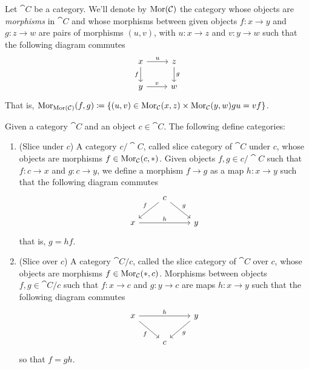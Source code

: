 \begin{definition}
\label{def:morphism-category}
Let \(\cat C\) be a category. We'll denote by \(\operatorname{Mor}(\mathcal C)\) the category
whose objects are \emph{morphisms} in \(\cat C\) and whose morphisms between
given objects \(f: x \to y\) and \(g: z \to w\) are pairs of morphisms \((u,
v)\), with \(u: x \to z\) and \(v: y \to w\) such that the following diagram
commutes
\[
  \begin{tikzcd}
    x \ar[d, swap, "f"] \ar[r, "u"] &z \ar[d, "g"] \\
    y \ar[r, "v"] &w
  \end{tikzcd}
\]
That is, \(\operatorname{Mor}_{\operatorname{Mor}(\mathcal C)}(f, g) \coloneq \{(u, v) \in \operatorname{Mor}_{\mathcal C}(x, z)
\times \operatorname{Mor}_{\mathcal C}(y, w) \relax g u = v f\}\).
\end{definition}

\begin{proposition}\label{prop: slice cat}
Given a category \(\cat C\) and an object \(c \in \cat C\). The following
define categories:
\begin{enumerate}[(SC1)]
\item\label{prop: slice under}
  (Slice under \(c\)) A category \(c/\cat C\), called slice category of
  \(\cat C\) under \(c\), whose objects are morphisms \(f \in \operatorname{Mor}_{\mathcal
  C}(c, *)\). Given objects \(f, g \in c/\cat C\) such that \(f: c \to x\)
  and \(g: c \to y\), we define a morphism \(f \to g\) as a map \(h: x \to
  y\) such that the following diagram commutes
  \[
    \begin{tikzcd}
      &c \ar[dl, swap,"f"] \ar[dr, "g"]\\
      x \ar[rr, "h"] & &y
    \end{tikzcd}
  \]
  that is, \(g = h  f\).
\item\label{prop: slice over}
  (Slice over \(c\)) A category \(\cat C/c\), called the slice category of
  \(\cat C\) over \(c\), whose objects are morphisms \(f \in \operatorname{Mor}_{\mathcal
  C}(*, c)\). Morphisms between objects \(f, g \in \cat C/c\) such that \(f:
  x \to c\) and \(g: y \to c\) are maps \(h: x \to y\) such that the
  following diagram commutes
  \[
    \begin{tikzcd}
      x \ar[rr, "h"] \ar[dr, swap, "f"]
        & &y \ar[dl, "g"] \\
        &c
    \end{tikzcd}
  \]
  so that \(f = g  h\).
\end{enumerate}
\end{proposition}

